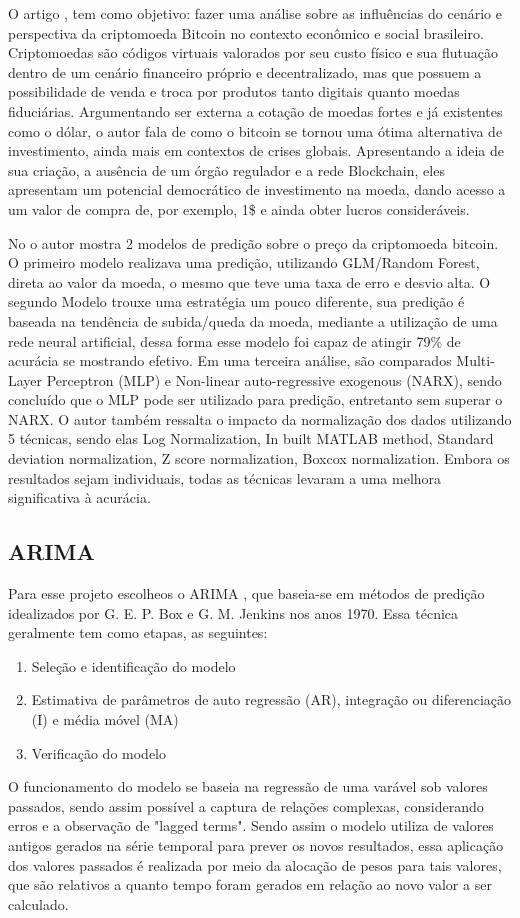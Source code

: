 \documentclass[sigplan,screen]{acmart}
\begin{document}
O artigo \cite{dos2021cenario}, tem como objetivo: fazer uma análise sobre as influências do cenário e perspectiva da criptomoeda Bitcoin no contexto econômico e social brasileiro.
Criptomoedas são códigos virtuais valorados por seu custo físico e sua flutuação dentro de um cenário financeiro próprio e decentralizado, mas que possuem a possibilidade de venda e troca por produtos tanto digitais quanto moedas fiduciárias.
Argumentando ser externa a cotação de moedas fortes e já existentes como o dólar, o autor fala de como o bitcoin se tornou uma ótima alternativa de investimento, ainda mais em contextos de crises globais.
Apresentando a ideia de sua criação, a ausência de um órgão regulador e a rede Blockchain, eles apresentam um potencial democrático de investimento na moeda, dando acesso a um valor de compra de, por exemplo, 1\$ e ainda obter lucros consideráveis.

No \cite{8323676} o autor mostra 2 modelos de predição sobre o preço da criptomoeda bitcoin.
O primeiro modelo realizava uma predição, utilizando GLM/Random Forest, direta ao valor da moeda, o mesmo que teve uma taxa de erro e desvio alta.
O segundo Modelo trouxe uma estratégia um pouco diferente, sua predição é baseada na tendência de subida/queda da moeda, mediante a utilização de uma rede neural artificial, dessa forma esse modelo foi capaz de atingir 79\% de acurácia se mostrando efetivo.
Em uma terceira análise, são comparados Multi-Layer Perceptron (MLP) e Non-linear auto-regressive exogenous (NARX), sendo concluído que o MLP pode ser utilizado para predição, entretanto sem superar o NARX.
O autor também ressalta o impacto da normalização dos dados utilizando 5 técnicas, sendo elas Log Normalization, In built MATLAB method, Standard deviation normalization, Z score normalization, Boxcox normalization.
Embora os resultados sejam individuais, todas as técnicas levaram a uma melhora significativa à acurácia.   
\subsection{ARIMA}
Para esse projeto escolheos o ARIMA , que baseia-se em métodos de predição idealizados por G. E. P. Box e G. M. Jenkins nos anos 1970.
Essa técnica geralmente tem como etapas, as seguintes:
\begin{enumerate}
  \item Seleção e identificação do modelo
  \item Estimativa de parâmetros de auto regressão (AR), integração ou diferenciação (I) e média móvel (MA)
  \item Verificação do modelo
\end{enumerate}
O funcionamento do modelo se baseia na regressão de uma varável sob valores passados, sendo assim possível a captura de relações complexas, considerando erros e a observação de "lagged terms". Sendo assim o modelo utiliza de valores antigos gerados na série temporal
para prever os novos resultados, essa aplicação dos valores passados é realizada por meio da alocação de pesos para tais valores, que são relativos a quanto tempo foram gerados em relação ao novo valor a ser calculado.
\end{document}
